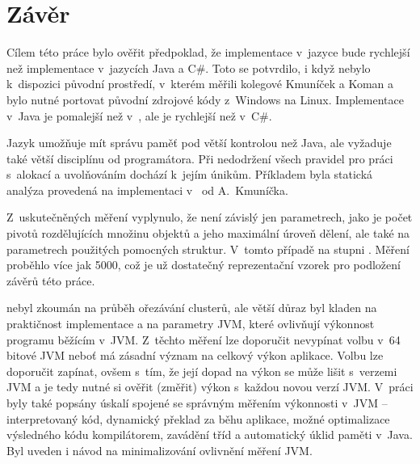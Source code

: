 \chapter{Závěr}

Cílem této práce bylo ověřit předpoklad, že implementace  v~jazyce \CC{} bude rychlejší než implementace v~jazycích Java a C\#.
Toto se potvrdilo, i když nebylo k~dispozici původní prostředí, v~kterém měřili kolegové Kmuníček a Koman a bylo nutné portovat původní zdrojové kódy \CC{} z~Windows na Linux.
Implementace v~Java je pomalejší než v~\CC, ale je rychlejší než v~C\#.

Jazyk \CC{} umožňuje mít správu paměť pod větší kontrolou než Java, ale vyžaduje také větší disciplínu od programátora.
Při nedodržení všech pravidel pro práci s~alokací a uvolňováním dochází k~jejím únikům.
Příkladem byla statická analýza provedená na implementaci v~\CC{} od A.~Kmuníčka.

Z~uskutečněných měření vyplynulo, že \MIndex{} není závislý jen parametrech, jako je počet pivotů rozdělujících množinu objektů a jeho maximální úroveň dělení, ale také na parametrech použitých pomocných struktur.
V~tomto případě na stupni \BPTree.
Měření proběhlo více jak 5000, což je už dostatečný reprezentační vzorek pro podložení závěrů této práce.

\MIndex{} nebyl zkoumán na průběh ořezávání clusterů, ale větší důraz byl kladen na praktičnost implementace a na parametry JVM, které ovlivňují výkonnost programu běžícím v~JVM.
Z~těchto měření lze doporučit nevypínat volbu  v~64 bitové JVM neboť má zásadní význam na celkový výkon aplikace.
Volbu  lze doporučit zapínat, ovšem s~tím, že její dopad na výkon se může lišit s~verzemi JVM a je tedy nutné si ověřit (změřit) výkon s~každou novou verzí JVM.
V~práci byly také popsány úskalí spojené se správným měřením výkonnosti v~JVM -- interpretovaný kód, dynamický překlad \bytecode{} za běhu aplikace, možné optimalizace výsledného kódu kompilátorem, zavádění tříd a automatický úklid paměti v~Java.
Byl uveden i návod na minimalizování ovlivnění měření  JVM.

